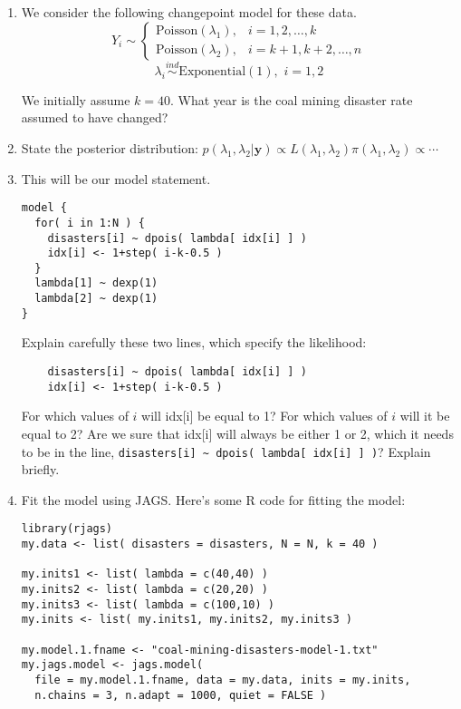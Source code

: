 \documentclass[11pt]{article}
\newcommand{\bfy}{{\mathbf{y}}}
\begin{document}
\begin{enumerate}
\begin{enumerate}
\item We consider the following changepoint model for these data.
$$Y_i \sim \left\{
\begin{array}{ll}
{\mbox{Poisson}}(\lambda_1), & i = 1,2,\ldots,k \\
{\mbox{Poisson}}(\lambda_2), & i = k+1,k+2,\ldots,n
\end{array}\right.$$
$$\lambda_i \stackrel{ind}{\sim} {\mbox{Exponential}}(1), \,\, i = 1,2$$

We initially assume $k=40$. What year is the coal mining disaster rate
assumed to have changed?

\item State the posterior distribution: $p( \lambda_1,\lambda_2 | \bfy ) \propto L( \lambda_1,
\lambda_2) \pi( \lambda_1,\lambda_2 ) \propto \cdots$

\item This will be our model statement.
\begin{verbatim}
model {
  for( i in 1:N ) {
    disasters[i] ~ dpois( lambda[ idx[i] ] )
    idx[i] <- 1+step( i-k-0.5 )
  }
  lambda[1] ~ dexp(1)
  lambda[2] ~ dexp(1)
}
\end{verbatim}

Explain carefully these two lines, which specify the likelihood:
\begin{verbatim}
    disasters[i] ~ dpois( lambda[ idx[i] ] )
    idx[i] <- 1+step( i-k-0.5 )
\end{verbatim}
For which values of $i$ will idx[i] be equal to 1? For which values of $i$ will
it be equal to 2? Are we sure that idx[i] will always be either 1 or 2, which it
needs to be in the line, \verb+disasters[i] ~ dpois( lambda[ idx[i] ] )+? Explain
briefly.

\pagebreak

\item Fit the model using JAGS. Here's some R code for fitting the model:

\begin{verbatim}
library(rjags)
my.data <- list( disasters = disasters, N = N, k = 40 )

my.inits1 <- list( lambda = c(40,40) )
my.inits2 <- list( lambda = c(20,20) )
my.inits3 <- list( lambda = c(100,10) )
my.inits <- list( my.inits1, my.inits2, my.inits3 )

my.model.1.fname <- "coal-mining-disasters-model-1.txt"
my.jags.model <- jags.model(
  file = my.model.1.fname, data = my.data, inits = my.inits,
  n.chains = 3, n.adapt = 1000, quiet = FALSE )


\end{verbatim}
\end{enumerate}
\end{enumerate}
\end{document}
